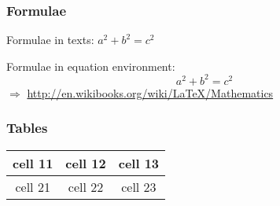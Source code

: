 % 

\begin{frame}
\frametitle{Formulae}
Formulae in texts: $a^2 + b^2 = c^2$

\noindent Formulae in equation environment:
\begin{equation}
a^2 + b^2 = c^2
\end{equation}
$\Rightarrow$ \url{http://en.wikibooks.org/wiki/LaTeX/Mathematics}
\end{frame}

\begin{frame}
\frametitle{Tables}
\begin{tabular}{c|c|c}
\hline
cell 11 & cell 12 & cell 13 \\
\hline
cell 21 & cell 22 & cell 23 \\
\hline
\end{tabular}
\end{frame}
